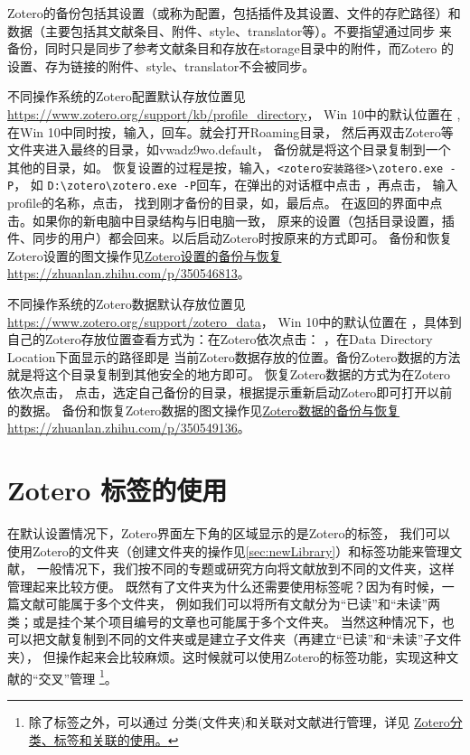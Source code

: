 \documentclass[cn,11pt,chinese]{elegantbook}
\begin{document}
	Zotero的备份包括其设置（或称为配置，包括插件及其设置、文件的存贮路径）和
	数据（主要包括其文献条目、附件、style、translator等）。不要指望通过同步
	来备份，同时只是同步了参考文献条目和存放在storage目录中的附件，而Zotero
	的设置、存为链接的附件、style、translator不会被同步。

	不同操作系统的Zotero配置默认存放位置见\url{https://www.zotero.org/support/kb/profile_directory}，
	Win 10中的默认位置在
	,
	在Win 10中同时按，输入，回车。就会打开Roaming目录，
	然后再双击Zotero等文件夹进入最终的目录，如vwadz9wo.default，
	备份就是将这个目录复制到一个其他的目录，如。
	恢复设置的过程是按，输入，\verb|<zotero安装路径>\zotero.exe -P|，
	如 \verb|D:\zotero\zotero.exe -P|回车，在弹出的对话框中点击
	，再点击，
	输入profile的名称，点击，
	找到刚才备份的目录，如，最后点。
	在返回的界面中点击。如果你的新电脑中目录结构与旧电脑一致，
	原来的设置（包括目录设置，插件、同步的用户）都会回来。以后启动Zotero时按原来的方式即可。
	备份和恢复Zotero设置的图文操作见\href{https://zhuanlan.zhihu.com/p/350546813}
	{Zotero设置的备份与恢复https://zhuanlan.zhihu.com/p/350546813}。

	不同操作系统的Zotero数据默认存放位置见\url{https://www.zotero.org/support/zotero_data}，
	Win 10中的默认位置在
	，具体到自己的Zotero存放位置查看方式为：在Zotero依次点击：
	，在Data Directory Location下面显示的路径即是
	当前Zotero数据存放的位置。备份Zotero数据的方法就是将这个目录复制到其他安全的地方即可。
	恢复Zotero数据的方式为在Zotero依次点击，
	点击，选定自己备份的目录，根据提示重新启动Zotero即可打开以前的数据。
	备份和恢复Zotero数据的图文操作见\href{https://zhuanlan.zhihu.com/p/350549136}
	{Zotero数据的备份与恢复https://zhuanlan.zhihu.com/p/350549136}。

	\section{Zotero 标签的使用} \label{sec:tag}
			在默认设置情况下，Zotero界面左下角的区域显示的是Zotero的标签，
			我们可以使用Zotero的文件夹（创建文件夹的操作见\cref{sec:newLibrary}）和标签功能来管理文献，
			一般情况下，我们按不同的专题或研究方向将文献放到不同的文件夹，这样管理起来比较方便。
			既然有了文件夹为什么还需要使用标签呢？因为有时候，一篇文献可能属于多个文件夹，
			例如我们可以将所有文献分为“已读”和“未读”两类；或是挂个某个项目编号的文章也可能属于多个文件夹。
			当然这种情况下，也可以把文献复制到不同的文件夹或是建立子文件夹（再建立“已读”和“未读”子文件夹），
			但操作起来会比较麻烦。这时候就可以使用Zotero的标签功能，实现这种文献的“交叉”管理
			\footnote{除了标签之外，可以通过
		分类(文件夹)和关联对文献进行管理，详见
		\href{https://zhuanlan.zhihu.com/p/275707703}{Zotero分类、标签和关联的使用。}}。
			
\end{document}
